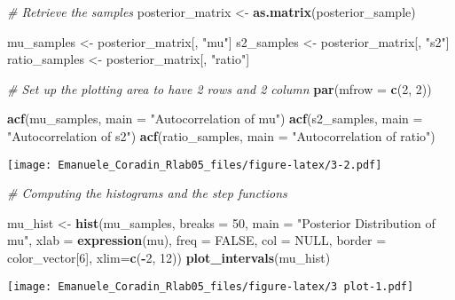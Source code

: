 \documentclass[
]{article}
\newenvironment{Shaded}{\begin{snugshade}}{\end{snugshade}}
\newcommand{\AttributeTok}[1]{\textcolor[rgb]{0.13,0.29,0.53}{#1}}
\newcommand{\CommentTok}[1]{\textcolor[rgb]{0.56,0.35,0.01}{\textit{#1}}}
\newcommand{\ConstantTok}[1]{\textcolor[rgb]{0.56,0.35,0.01}{#1}}
\newcommand{\DecValTok}[1]{\textcolor[rgb]{0.00,0.00,0.81}{#1}}
\newcommand{\FunctionTok}[1]{\textcolor[rgb]{0.13,0.29,0.53}{\textbf{#1}}}
\newcommand{\NormalTok}[1]{#1}
\newcommand{\OtherTok}[1]{\textcolor[rgb]{0.56,0.35,0.01}{#1}}
\newcommand{\SpecialCharTok}[1]{\textcolor[rgb]{0.81,0.36,0.00}{\textbf{#1}}}
\newcommand{\StringTok}[1]{\textcolor[rgb]{0.31,0.60,0.02}{#1}}
\begin{document}
\begin{Shaded}
\begin{Highlighting}[]
\CommentTok{\# Retrieve the samples}
\NormalTok{posterior\_matrix }\OtherTok{\textless{}{-}} \FunctionTok{as.matrix}\NormalTok{(posterior\_sample)}

\NormalTok{mu\_samples }\OtherTok{\textless{}{-}}\NormalTok{ posterior\_matrix[, }\StringTok{"mu"}\NormalTok{]}
\NormalTok{s2\_samples }\OtherTok{\textless{}{-}}\NormalTok{ posterior\_matrix[, }\StringTok{"s2"}\NormalTok{]}
\NormalTok{ratio\_samples }\OtherTok{\textless{}{-}}\NormalTok{ posterior\_matrix[, }\StringTok{"ratio"}\NormalTok{]}

\CommentTok{\# Set up the plotting area to have 2 rows and 2 column}
\FunctionTok{par}\NormalTok{(}\AttributeTok{mfrow =} \FunctionTok{c}\NormalTok{(}\DecValTok{2}\NormalTok{, }\DecValTok{2}\NormalTok{))  }

\FunctionTok{acf}\NormalTok{(mu\_samples, }\AttributeTok{main =} \StringTok{"Autocorrelation of mu"}\NormalTok{)}
\FunctionTok{acf}\NormalTok{(s2\_samples, }\AttributeTok{main =} \StringTok{"Autocorrelation of s2"}\NormalTok{)}
\FunctionTok{acf}\NormalTok{(ratio\_samples, }\AttributeTok{main =} \StringTok{"Autocorrelation of ratio"}\NormalTok{)}
\end{Highlighting}
\end{Shaded}

\texttt{[image: Emanuele\_Coradin\_Rlab05\_files/figure-latex/3-2.pdf]}

\begin{Shaded}
\begin{Highlighting}[]
\CommentTok{\# Computing the histograms and the step functions}

\NormalTok{mu\_hist }\OtherTok{\textless{}{-}} \FunctionTok{hist}\NormalTok{(mu\_samples, }\AttributeTok{breaks =} \DecValTok{50}\NormalTok{, }\AttributeTok{main =} \StringTok{"Posterior Distribution of mu"}\NormalTok{, }\AttributeTok{xlab =} \FunctionTok{expression}\NormalTok{(mu), }\AttributeTok{freq =} \ConstantTok{FALSE}\NormalTok{, }\AttributeTok{col =} \ConstantTok{NULL}\NormalTok{, }\AttributeTok{border =}\NormalTok{ color\_vector[}\DecValTok{6}\NormalTok{], }\AttributeTok{xlim=}\FunctionTok{c}\NormalTok{(}\SpecialCharTok{{-}}\DecValTok{2}\NormalTok{, }\DecValTok{12}\NormalTok{))}
\FunctionTok{plot\_intervals}\NormalTok{(mu\_hist)}
\end{Highlighting}
\end{Shaded}

\texttt{[image: Emanuele\_Coradin\_Rlab05\_files/figure-latex/3 plot-1.pdf]}
\end{document}
